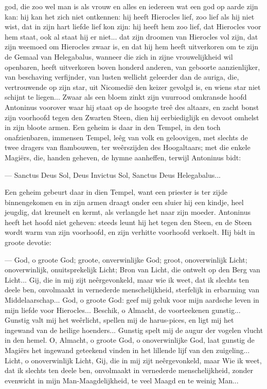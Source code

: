 \documentclass[a4paper, 12pt, oneside, dutch]{article}
\begin{document}
god, die zoo wel man is als vrouw en alles en iedereen wat een god op aarde zijn kan: hij kan het zich niet ontkennen: hij heeft Hierocles lief, zoo lief als hij niet wist, dat in zijn hart liefde lief kon zijn: hij heeft hem zoo lief, dat Hierocles voor hem staat, ook al staat hij er niet... dat zijn droomen van Hierocles vol zijn, dat zijn weemoed om Hierocles zwaar is, en dat hij hem heeft uitverkoren om te zijn de Gemaal van Helegabalus, wanneer die zich in zijne vrouwelijkheid wil openbaren, heeft uitverkoren boven honderd anderen, van geboorte aanzienlijker, van beschaving verfijnder, van lusten wellicht geleerder dan de auriga, die, vertrouwende op zijn star, uit Nicomedië den keizer gevolgd is, en wiens star niet schijnt te liegen... Zwaar als een bloem zinkt zijn vuurrood omkransde hoofd Antoninus voorover waar hij staat op de hoogste treê des altaars, en zacht bonst zijn voorhoofd tegen den Zwarten Steen, dien hij eerbiediglijk en devoot omhelst in zijn bloote armen. Een geheim is daar in den Tempel, in den toch onafzienbaren, immensen Tempel, leêg van volk en geloovigen, met slechts de twee dragers van flambouwen, ter weêrszijden des Hoogaltaars; met die enkele Magiërs, die, handen geheven, de hymne aanheffen, terwijl Antoninus bidt:

--- Sanctus Deus Sol, Deus Invictus Sol, Sanctus Deus Helegabalus...

Een geheim gebeurt daar in dien Tempel, want een priester is ter zijde binnengekomen en in zijn armen draagt onder een sluier hij een kindje, heel jeugdig, dat kreunelt en kermt, als verlangde het naar zijn moeder. Antoninus heeft het hoofd niet geheven: steeds leunt hij het tegen den Steen, en de Steen wordt warm van zijn voorhoofd, en zijn verhitte voorhoofd verkoelt. Hij bidt in groote devotie:

--- God, o groote God; groote, onverwinlijke God; groot, onoverwinlijk Licht; onoverwinlijk, onuitsprekelijk Licht; Bron van Licht, die ontwelt op den Berg van Licht... Gij, die in mij zijt neêrgevonkeld, maar wie ik weet, dat ik slechts ten deele ben, onvolmaakt in vernederde menschelijkheid, sterfelijk in erbarming van Middelaarschap... God, o groote God: geef mij geluk voor mijn aardsche leven in mijn liefde voor Hierocles... Beschik, o Almacht, de voorteekenen gunstig... Gunstig valt mij het weêrlicht, spellen mij de harus-pices, en ligt mij het ingewand van de heilige hoenders... Gunstig spelt mij de augur der vogelen vlucht in den hemel. O, Almacht, o groote God, o onoverwinlijke God, laat gunstig de Magiërs het ingewand geteekend vinden in het lillende lijf van den zuigeling... Licht, o onoverwinlijk Licht, Gij, die in mij zijt neêrgevonkeld, maar Wie ik weet, dat ik slechts ten deele ben, onvolmaakt in vernederde menschelijkheid, zonder evenwicht in mijn Man-Maagdelijkheid, te veel Maagd en te weinig Man...
\end{document}
